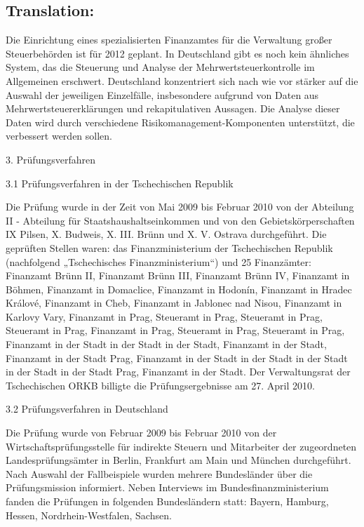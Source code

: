 \documentclass[10pt]{article}
\begin{document}
\subsection*{Translation:}

Die Einrichtung eines spezialisierten Finanzamtes für die Verwaltung großer Steuerbehörden ist für 2012 geplant.
In Deutschland gibt es noch kein ähnliches System, das die Steuerung und Analyse der Mehrwertsteuerkontrolle im Allgemeinen erschwert.
Deutschland konzentriert sich nach wie vor stärker auf die Auswahl der jeweiligen Einzelfälle, insbesondere aufgrund von Daten aus Mehrwertsteuererklärungen und rekapitulativen Aussagen.
Die Analyse dieser Daten wird durch verschiedene Risikomanagement-Komponenten unterstützt, die verbessert werden sollen.


3. Prüfungsverfahren



3.1 Prüfungsverfahren in der Tschechischen Republik

Die Prüfung wurde in der Zeit von Mai 2009 bis Februar 2010 von der Abteilung II - Abteilung für Staatshaushaltseinkommen und von den Gebietskörperschaften IX Pilsen, X. Budweis, X. III. Brünn und X. V. Ostrava durchgeführt.
Die geprüften Stellen waren: das Finanzministerium der Tschechischen Republik (nachfolgend „Tschechisches Finanzministerium“) und 25 Finanzämter: Finanzamt Brünn II, Finanzamt Brünn III, Finanzamt Brünn IV, Finanzamt in Böhmen, Finanzamt in Domaclice, Finanzamt in Hodonín, Finanzamt in Hradec Králové, Finanzamt in Cheb, Finanzamt in Jablonec nad Nisou, Finanzamt in Karlovy Vary, Finanzamt in Prag, Steueramt in Prag, Steueramt in Prag, Steueramt in Prag, Finanzamt in Prag, Steueramt in Prag, Steueramt in Prag, Finanzamt in der Stadt in der Stadt in der Stadt, Finanzamt in der Stadt, Finanzamt in der Stadt Prag, Finanzamt in der Stadt in der Stadt in der Stadt in der Stadt in der Stadt Prag, Finanzamt in der Stadt.
Der Verwaltungsrat der Tschechischen ORKB billigte die Prüfungsergebnisse am 27. April 2010.


3.2 Prüfungsverfahren in Deutschland

Die Prüfung wurde von Februar 2009 bis Februar 2010 von der Wirtschaftsprüfungsstelle für indirekte Steuern und Mitarbeiter der zugeordneten Landesprüfungsämter in Berlin, Frankfurt am Main und München durchgeführt.
Nach Auswahl der Fallbeispiele wurden mehrere Bundesländer über die Prüfungsmission informiert.
Neben Interviews im Bundesfinanzministerium fanden die Prüfungen in folgenden Bundesländern statt: Bayern, Hamburg, Hessen, Nordrhein-Westfalen, Sachsen.
\end{document}

